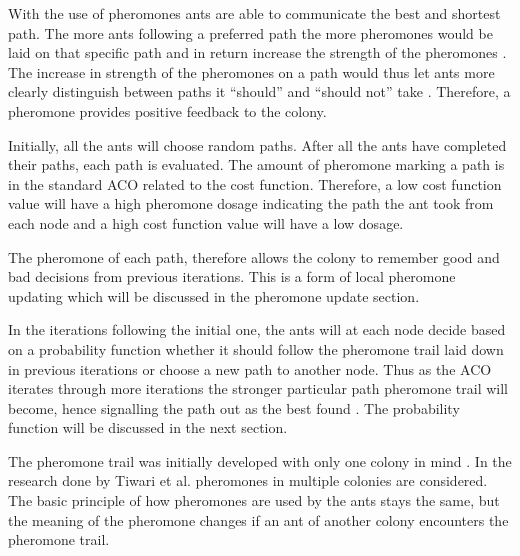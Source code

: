 With the use of pheromones ants are able to communicate the best and shortest path\cite{AntQAP,AntsAndStigmergy,CompuIntelligenceIntro}. The more ants following a preferred path the more pheromones would be laid on that specific path and in return increase the strength of the pheromones \cite{ImpACOComplex}. The increase in strength of the pheromones on a path would thus let ants more clearly distinguish between paths it “should” and “should not” take \cite{ImpACOComplex}. Therefore, a pheromone provides positive feedback to the colony\cite{AntQAP,AntsAndStigmergy,CompuIntelligenceIntro}.

Initially, all the ants will choose random paths\cite{AntQAP,AntsAndStigmergy,CompuIntelligenceIntro}. After all the ants have completed their paths, each path is evaluated\cite{CompuIntelligenceIntro}. The amount of pheromone marking a path is in the standard ACO related to the cost function\cite{AntQAP,AntsAndStigmergy,CompuIntelligenceIntro}. Therefore, a low cost function value will have a high pheromone dosage indicating the path the ant took from each node and a high cost function value will have a low dosage\cite{CompuIntelligenceIntro}. 

The pheromone of each path, therefore allows the colony to remember good and bad decisions from previous iterations\cite{CompuIntelligenceIntro}. This is a form of local pheromone updating \label{def:localpheromoneupdate}which will be discussed in the pheromone update section. 

In the iterations following the initial one, the ants will at each node decide based on a probability function whether it should follow the pheromone trail laid down in previous iterations or choose a new path to another node\cite{AntQAP,AntsAndStigmergy,CompuIntelligenceIntro}. Thus as the ACO iterates through more iterations the stronger particular path pheromone trail will become, hence signalling the path out as the best found \cite{CompuIntelligenceIntro}. The probability function will be discussed in the next section.

The pheromone trail was initially developed with only one colony in mind \cite{CompuIntelligenceIntro}. In the research done by Tiwari et al.\cite{ACOLargeProblem} pheromones in multiple colonies are considered. The basic principle of how pheromones are used by the ants stays the same, but the meaning of the pheromone changes if an ant of another colony encounters the pheromone trail\cite{AntQAP,AntsAndStigmergy,CompuIntelligenceIntro}. 

